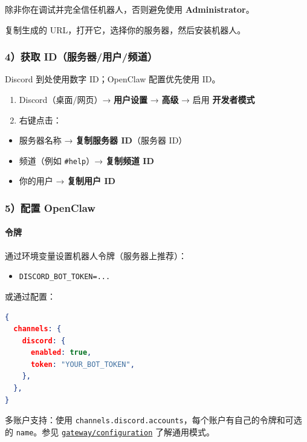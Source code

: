 除非你在调试并完全信任机器人，否则避免使用 \textbf{Administrator}。

复制生成的 URL，打开它，选择你的服务器，然后安装机器人。

\subsubsection{4）获取 ID（服务器/用户/频道）}


Discord 到处使用数字 ID；OpenClaw 配置优先使用 ID。

\begin{enumerate}
  \item Discord（桌面/网页）→ \textbf{用户设置} → \textbf{高级} → 启用 \textbf{开发者模式}
  \item 右键点击：
\end{enumerate}

\begin{itemize}
  \item 服务器名称 → \textbf{复制服务器 ID}（服务器 ID）
  \item 频道（例如 \texttt{\#help}）→ \textbf{复制频道 ID}
  \item 你的用户 → \textbf{复制用户 ID}
\end{itemize}


\subsubsection{5）配置 OpenClaw}


\paragraph{令牌}


通过环境变量设置机器人令牌（服务器上推荐）：

\begin{itemize}
  \item \texttt{DISCORD\_BOT\_TOKEN=...}
\end{itemize}


或通过配置：

\begin{lstlisting}[language=json]
{
  channels: {
    discord: {
      enabled: true,
      token: "YOUR_BOT_TOKEN",
    },
  },
}
\end{lstlisting}


多账户支持：使用 \texttt{channels.discord.accounts}，每个账户有自己的令牌和可选的 \texttt{name}。参见 \href{/gateway/configuration\#telegramaccounts--discordaccounts--slackaccounts--signalaccounts--imessageaccounts}{\texttt{gateway/configuration}} 了解通用模式。

